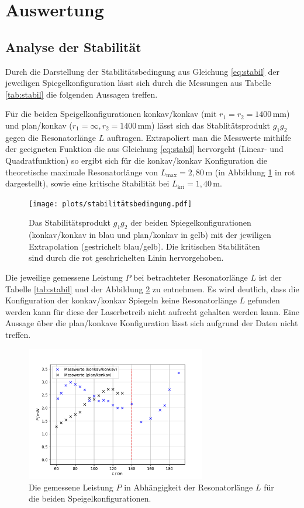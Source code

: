 \newpage
\section{Auswertung}
\subsection{Analyse der Stabilität}
Durch die Darstellung der Stabilitätsbedingung aus Gleichung \ref{eq:stabil} der jeweiligen Spiegelkonfiguration
lässt sich durch die Messungen aus Tabelle \ref{tab:stabil} die folgenden Aussagen treffen.

Für die beiden Speigelkonfigurationen konkav/konkav (mit $r_1=r_2=1400\,$mm) und plan/konkav ($r_1=\infty {,} r_2=1400\,$mm)
lässt sich das Stablitätsprodukt $g_1g_2$ gegen die Resonatorlänge $L$ auftragen.
Extrapoliert man die Messwerte mithilfe der geeigneten Funktion die aus Gleichung \ref{eq:stabil} hervorgeht (Linear- und Quadratfunktion)
so ergibt sich für die konkav/konkav Konfiguration die theoretische maximale Resonatorlänge von $L_{\text{max}}=2,80\,$m (in Abbildung \ref{fig:stabil} in rot dargestellt), 
sowie eine kritische Stabilität bei $L_{\text{kri}}=1,40\,$m.

\begin{figure}[H]
    \center
    \texttt{[image: plots/stabilitätsbedingung.pdf]}
    \caption{Das Stabilitätsprodukt $g_1g_2$ der beiden Spiegelkonfigurationen (konkav/konkav in blau und plan/konkav in gelb) mit der jewiligen Extrapolation (gestrichelt blau/gelb).
    Die kritischen Stabilitäten sind durch die rot geschrichelten Linin hervorgehoben.}
    \label{fig:stabil}
\end{figure}
\label{sec:Auswertung}

Die jeweilige gemessene Leistung $P$ bei betrachteter Resonatorlänge $L$ ist der Tabelle \ref{tab:stabil} und 
der Abbildung \ref{fig:leistung} zu entnehmen. Es wird deutlich, dass die Konfiguration der konkav/konkav Spiegeln keine Resonatorlänge $L$ gefunden 
werden kann für diese der Laserbetreib nicht aufrecht gehalten werden kann. Eine Aussage über die plan/konkave Konfiguration 
lässt sich aufgrund der Daten nicht treffen.
\begin{figure}[H]
    \center
    \includegraphics[width=0.7\textwidth]{plots/leistung.pdf}
    \caption{Die gemessene Leistung $P$ in Abhängigkeit der Resonatorlänge $L$ für die beiden Speigelkonfigurationen.}
    \label{fig:leistung}
\end{figure}

